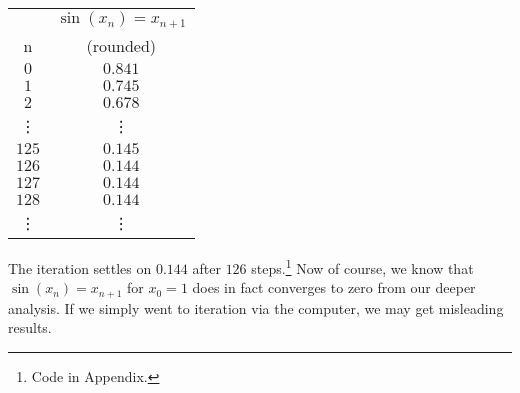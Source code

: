 \documentclass[11pt]{article}
\theoremstyle{definition}
\newcommand{\1}[1]{\mathbf{1} \left \{ #1 \right \}}
\begin{document}
\begin{center}
\begin{tabular}{ |c|c| }
\hline
 & \(\sin(x_n) = x_{n+1}\) \\
n  & (rounded) \\
\hline
$0$ & $0.841$ \\
$1$ & $0.745$ \\
$2$ & $0.678$ \\
\vdots & \vdots \\
$125$ & $0.145$ \\
$126$ & $0.144$ \\
$127$ & $0.144$ \\
$128$ & $0.144$ \\
\vdots & \vdots \\
\hline
\end{tabular}
\end{center}
The iteration settles on $0.144$ after $126$ steps.\footnote{Code in Appendix.}  Now of course, we know that $\sin (x_n) = x_{n+1}$ for $x_0 = 1$ does in fact converges to zero from our deeper analysis.  If we simply went to iteration via the computer, we may get misleading results.
\end{document}
